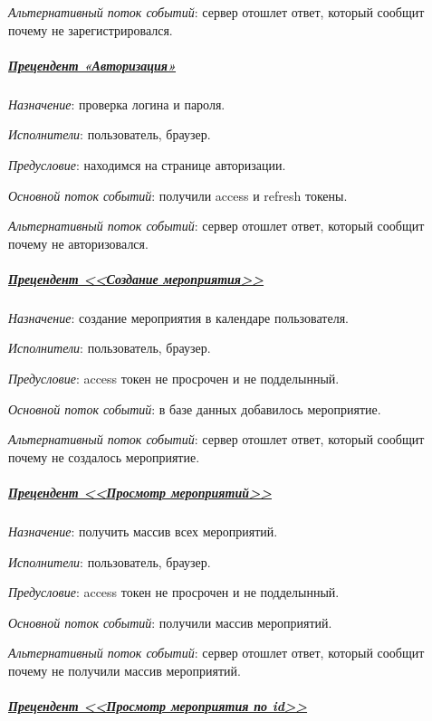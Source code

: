 \textit{Альтернативный поток событий}: сервер отошлет ответ, который сообщит почему не зарегистрировался.


\subparagraph{\underline{Прецендент «Авторизация»}} \hspace{0pt}

\textit{Назначение}: проверка логина и пароля.

\textit{Исполнители}: пользователь, браузер.

\textit{Предусловие}: находимся на странице авторизации.

\textit{Основной поток событий}: получили access и refresh токены.

\textit{Альтернативный поток событий}: сервер отошлет ответ, который сообщит почему не авторизовался.


\newpage
\subparagraph{\underline{Прецендент <<Создание мероприятия>>}} \hspace{0pt}

\textit{Назначение}: создание мероприятия в календаре пользователя.

\textit{Исполнители}: пользователь, браузер.

\textit{Предусловие}: access токен не просрочен и не подделынный.

\textit{Основной поток событий}: в базе данных добавилось мероприятие.

\textit{Альтернативный поток событий}: сервер отошлет ответ, который сообщит почему не создалось мероприятие.


\subparagraph{\underline{Прецендент <<Просмотр мероприятий>>}} \hspace{0pt}

\textit{Назначение}: получить массив всех мероприятий.

\textit{Исполнители}: пользователь, браузер.

\textit{Предусловие}: access токен не просрочен и не подделынный.

\textit{Основной поток событий}: получили массив мероприятий.

\textit{Альтернативный поток событий}: сервер отошлет ответ, который сообщит почему не получили массив мероприятий.


\subparagraph{\underline{Прецендент <<Просмотр мероприятия по id>>}} \hspace{0pt}

